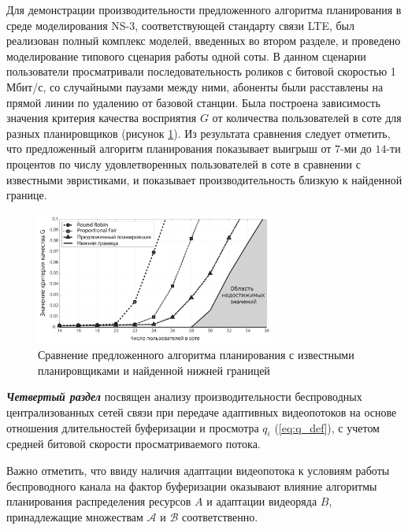 Для демонстрации производительности предложенного алгоритма планирования в среде моделирования NS-3, соответствующей стандарту связи LTE, был реализован полный комплекс моделей, введенных во втором разделе, и проведено моделирование типового сценария работы одной соты. В данном сценарии пользователи просматривали последовательность роликов с битовой скоростью 1 Мбит/с, со случайными паузами между ними, абоненты были расставлены на прямой линии по удалению от базовой станции. Была построена зависимость значения критерия качества  восприятия $G$ от количества пользователей в соте для разных планировщиков (рисунок \ref{fig:G_PLOT}). Из результата сравнения следует отметить, что предложенный алгоритм планирования показывает выигрыш от $7$-ми до $14$-ти процентов по числу удовлетворенных пользователей в соте в сравнении с известными эвристиками, и показывает производительность близкую к найденной границе.
\begin{figure}[htbp]
\begin{center}
\includegraphics[width=0.7\textwidth]{../Dissertation/images//Chapter3/G_PLOT.pdf}
\caption{Сравнение предложенного алгоритма планирования с известными планировщиками и найденной нижней границей}
\label{fig:G_PLOT}
\end{center}
\end{figure}

\textbf{\textit{Четвертый раздел}} посвящен анализу производительности беспроводных централизованных сетей связи при передаче адаптивных видеопотоков на основе отношения длительностей буферизации и просмотра $q_i$ (\ref{eq:q_def}), с учетом средней битовой скорости просматриваемого потока.

Важно отметить, что ввиду наличия адаптации видеопотока к условиям работы беспроводного канала
на фактор буферизации оказывают влияние алгоритмы планирования распределения ресурсов $A$ и адаптации видеоряда $B$, принадлежащие множествам $\mathcal{A}$ и $\mathcal{B}$ соответственно.

